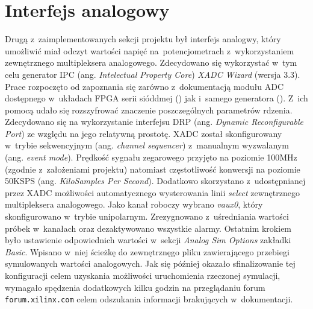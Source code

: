 \section{Interfejs analogowy}

Drugą z~zaimplementowanych sekcji projektu był interfejs analogwy, który umożliwić miał odczyt wartości napięć na~potencjometrach z~wykorzystaniem zewnętrznego multipleksera analogowego. Zdecydowano się wykorzystać w~tym celu generator IPC (ang. \textit{Intelectual Property Core}) \textit{XADC Wizard} (wersja 3.3). Prace rozpoczęto od zapoznania się zarówno z~dokumentacją modułu ADC dostępnego w~układach FPGA serii sióddmej (\cite{xilinx_adc_series_seven}) jak i~samego generatora (\cite{xilinx_xadc_wizard}). Z~ich pomocą udało się rozszyfrować znaczenie poszczególnych parametrów rdzenia. Zdecydowano się na wykorzystanie interfejsu DRP (ang. \textit{Dynamic Reconfigurable Port}) ze względu na jego relatywną prostotę. XADC został skonfigurowany w~trybie sekwencyjnym (ang. \textit{channel sequencer}) z~manualnym wyzwalanym (ang. \textit{event mode}). Prędkość sygnału zegarowego przyjęto na poziomie 100MHz (zgodnie z~założeniami projektu) natomiast częstotliwość konwersji na poziomie 50KSPS (ang. \textit{KiloSamples Per Second}). Dodatkowo skorzystano z~udostępnianej przez XADC możliwości automatycznego wysterowania linii \textit{select} zewnętrznego multipleksera analogowego. Jako kanał roboczy wybrano \textit{vaux0}, który skonfigurowano w~trybie unipolarnym. Zrezygnowano z~uśredniania wartości próbek w~kanałach oraz dezaktywowano wszystkie alarmy. Ostatnim krokiem było ustawienie odpowiednich wartości w~sekcji \textit{Analog Sim Options} zakładki \textit{Basic}. Wpisano w~niej ścieżkę do zewnętrznęgo pliku zawierającego przebiegi symulowanych wartości analogowych. Jak się później okazało sfinalizowanie tej konfiguracji celem uzyskania możliwości uruchomienia rzeczonej symulacji, wymagało spędzenia dodatkowych kilku godzin na przeglądaniu forum \verb|forum.xilinx.com| celem odszukania informacji brakujących w~dokumentacji.

